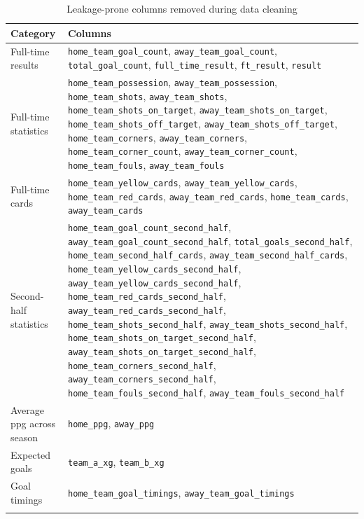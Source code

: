 \documentclass[pdflatex,sn-mathphys-num]{sn-jnl}
\theoremstyle{thmstyleone}
\theoremstyle{thmstyletwo}
\theoremstyle{thmstylethree}
\begin{document}
\begin{table}[htbp]
\centering
\caption{Leakage-prone columns removed during data cleaning}
\label{tab:leakage_columns}
\begin{tabular}{@{}p{3.5cm}p{9.5cm}@{}}
\toprule
\textbf{Category} & \textbf{Columns} \\
\midrule
Full-time results & \texttt{home\_team\_goal\_count}, \texttt{away\_team\_goal\_count}, \texttt{total\_goal\_count}, \texttt{full\_time\_result}, \texttt{ft\_result}, \texttt{result} \\
\midrule
Full-time statistics & \texttt{home\_team\_possession}, \texttt{away\_team\_possession}, \texttt{home\_team\_shots}, \texttt{away\_team\_shots}, \texttt{home\_team\_shots\_on\_target}, \texttt{away\_team\_shots\_on\_target}, \texttt{home\_team\_shots\_off\_target}, \texttt{away\_team\_shots\_off\_target}, \texttt{home\_team\_corners}, \texttt{away\_team\_corners}, \texttt{home\_team\_corner\_count}, \texttt{away\_team\_corner\_count}, \texttt{home\_team\_fouls}, \texttt{away\_team\_fouls} \\
\midrule
Full-time cards & \texttt{home\_team\_yellow\_cards}, \texttt{away\_team\_yellow\_cards}, \texttt{home\_team\_red\_cards}, \texttt{away\_team\_red\_cards}, \texttt{home\_team\_cards}, \texttt{away\_team\_cards} \\
\midrule
Second-half statistics & \texttt{home\_team\_goal\_count\_second\_half}, \texttt{away\_team\_goal\_count\_second\_half}, \texttt{total\_goals\_second\_half}, \texttt{home\_team\_second\_half\_cards}, \texttt{away\_team\_second\_half\_cards}, \texttt{home\_team\_yellow\_cards\_second\_half}, \texttt{away\_team\_yellow\_cards\_second\_half}, \texttt{home\_team\_red\_cards\_second\_half}, \texttt{away\_team\_red\_cards\_second\_half}, \texttt{home\_team\_shots\_second\_half}, \texttt{away\_team\_shots\_second\_half}, \texttt{home\_team\_shots\_on\_target\_second\_half}, \texttt{away\_team\_shots\_on\_target\_second\_half}, \texttt{home\_team\_corners\_second\_half}, \texttt{away\_team\_corners\_second\_half}, \texttt{home\_team\_fouls\_second\_half}, \texttt{away\_team\_fouls\_second\_half} \\
\midrule
Average ppg across season  & \texttt{home\_ppg}, \texttt{away\_ppg} \\
\midrule
Expected goals & \texttt{team\_a\_xg}, \texttt{team\_b\_xg} \\
\midrule
Goal timings & \texttt{home\_team\_goal\_timings}, \texttt{away\_team\_goal\_timings} \\
\botrule
\end{tabular}
\end{table}
\end{document}
